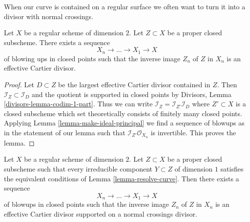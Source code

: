 \noindent
When our curve is contained on a regular surface we often want to
turn it into a divisor with normal crossings.

\begin{lemma}
\label{lemma-turn-into-effective-Cartier}
Let $X$ be a regular scheme of dimension $2$. Let $Z \subset X$
be a proper closed subscheme. There exists a sequence
$$
X_n \to \ldots \to X_1 \to X
$$
of blowing ups in closed points such that the inverse image $Z_n$ of $Z$
in $X_n$ is an effective Cartier divisor.
\end{lemma}

\begin{proof}
Let $D \subset Z$ be the largest effective Cartier divisor contained in $Z$.
Then $\mathcal{I}_Z \subset \mathcal{I}_D$ and the quotient is supported
in closed points by Divisors, Lemma \ref{divisors-lemma-codim-1-part}.
Thus we can write $\mathcal{I}_Z = \mathcal{I}_{Z'} \mathcal{I}_D$
where $Z' \subset X$ is a closed subscheme which set theoretically
consists of finitely many closed points. Applying
Lemma \ref{lemma-make-ideal-principal}
we find a sequence of blowups as in the statement of our lemma
such that $\mathcal{I}_{Z'}\mathcal{O}_{X_n}$ is invertible.
This proves the lemma.
\end{proof}

\begin{lemma}
\label{lemma-embedded-resolution}
Let $X$ be a regular scheme of dimension $2$. Let $Z \subset X$
be a proper closed subscheme such that every irreducible component
$Y \subset Z$ of dimension $1$ satisfies the equivalent conditions of
Lemma \ref{lemma-resolve-curve}. Then there exists a sequence
$$
X_n \to \ldots \to X_1 \to X
$$
of blowups in closed points such that the inverse image $Z_n$ of $Z$
in $X_n$ is an effective Cartier divisor supported on a normal crossings
divisor.
\end{lemma}

